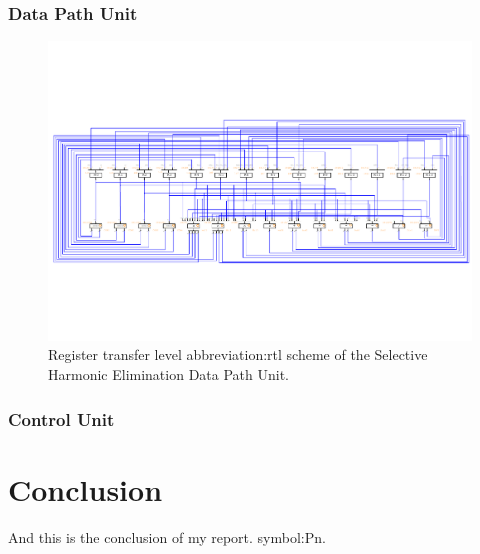 \documentclass[a4paper, twoside, 11pt]{article}
\newcommand{\fbar}{\FloatBarrier}
\begin{document}
        \subsubsection{Data Path Unit}\label{sh:data-path-unit}
            \begin{figure}[htbp!]
                \centering
                \includegraphics[width=1\textwidth]{src/pdf/she-rtl.pdf}
                \caption{Register transfer level \gls{abbreviation:rtl} scheme of the Selective Harmonic Elimination Data Path Unit.}
                \label{fig:she-rtl}
            \end{figure}
    
        \subsubsection{Control Unit}\label{subsubsec:sh-elimination-control-unit}

        
    \fbar


\newpage
{} 
\section*{Conclusion}
And this is the conclusion of my report. \gls{symbol:Pn}.

\flushbottom %

\end{document}
